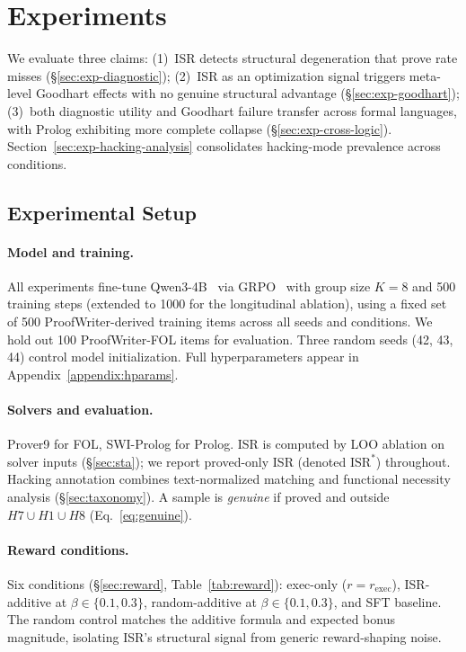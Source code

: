 
\section{Experiments}
\label{sec:experiments}

We evaluate three claims: (1)~ISR detects structural degeneration that prove rate misses (\S\ref{sec:exp-diagnostic}); (2)~ISR as an optimization signal triggers meta-level Goodhart effects with no genuine structural advantage (\S\ref{sec:exp-goodhart}); (3)~both diagnostic utility and Goodhart failure transfer across formal languages, with Prolog exhibiting more complete collapse (\S\ref{sec:exp-cross-logic}).
Section~\ref{sec:exp-hacking-analysis} consolidates hacking-mode prevalence across conditions.

\subsection{Experimental Setup}
\label{sec:exp-setup}

\paragraph{Model and training.}
All experiments fine-tune Qwen3-4B~\citep{placeholder-qwen} via GRPO~\citep{deepseekmath} with group size $K{=}8$ and 500 training steps (extended to 1000 for the longitudinal ablation), using a fixed set of 500 ProofWriter-derived training items across all seeds and conditions.
We hold out 100 ProofWriter-FOL items for evaluation.
Three random seeds (42, 43, 44) control model initialization.
Full hyperparameters appear in Appendix~\ref{appendix:hparams}.

\paragraph{Solvers and evaluation.}
Prover9 for FOL, SWI-Prolog for Prolog.
ISR is computed by LOO ablation on solver inputs (\S\ref{sec:sta}); we report proved-only ISR (denoted $\mathrm{ISR}^*$) throughout.
Hacking annotation combines text-normalized matching and functional necessity analysis (\S\ref{sec:taxonomy}).
A sample is \emph{genuine} if proved and outside $H7 \cup H1 \cup H8$ (Eq.~\ref{eq:genuine}).

\paragraph{Reward conditions.}
Six conditions (\S\ref{sec:reward}, Table~\ref{tab:reward}): exec-only ($r{=}r_\mathrm{exec}$), ISR-additive at $\beta \in \{0.1, 0.3\}$, random-additive at $\beta \in \{0.1, 0.3\}$, and SFT baseline.
The random control matches the additive formula and expected bonus magnitude, isolating ISR's structural signal from generic reward-shaping noise.

